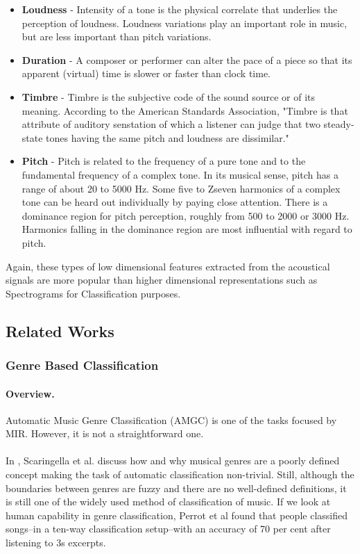 \begin{itemize}
        \item \textbf{Loudness} - Intensity of a tone is the physical correlate that underlies the perception of loudness. Loudness variations play an important role in music, but are less important than pitch variations.

        \item \textbf{Duration} - A composer or performer can alter the pace of a piece so that its apparent (virtual) time is slower or faster than clock time. 

        \item \textbf{Timbre} - Timbre is the subjective code of the sound source or of its meaning. According to the American Standards Association, "Timbre
                is that attribute of auditory senstation of which a listener can judge that two steady-state tones having the same pitch and loudness are dissimilar."

        \item \textbf{Pitch} - Pitch is related to the frequency of a pure tone and to the fundamental frequency of a complex tone. In its musical sense, pitch
                has a range of about 20 to 5000 Hz. Some five to Zseven harmonics of a complex tone can be heard out individually by paying close attention. There
                is a dominance region for pitch perception, roughly from 500 to 2000 or 3000 Hz. Harmonics falling in the dominance region are most influential 
                with regard to pitch.

\end{itemize}

Again, these types of low dimensional features extracted from the acoustical signals are more popular than higher dimensional representations such as
Spectrograms for Classification purposes. \cite{prasad2007}

\subsection{Related Works}
\subsubsection{Genre Based Classification}

\paragraph{Overview.}
Automatic Music Genre Classification (AMGC) is one of the tasks focused by MIR. However, it is not a straightforward one.\\
\\
In \cite{Scaringella2006}, Scaringella et al. discuss how and why musical genres are a poorly defined concept making the task of automatic classification non-trivial.
Still, although the boundaries between genres are fuzzy and there are no well-defined definitions, it is still one of the widely used method of classification of music. 
If we look at human capability in genre classification, Perrot et al \cite{Perrot1999} found that people classified songs--in a ten-way classification setup--with an accuracy of 70 per cent after listening to 3s excerpts.

